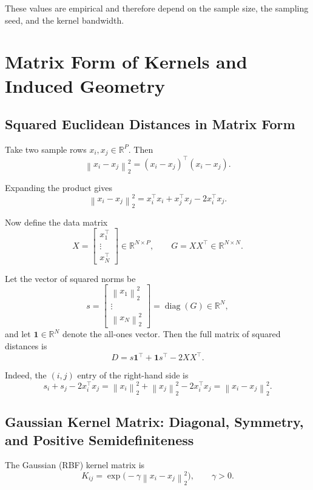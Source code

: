 \documentclass[11pt]{article}
\newcommand{\R}{\mathbb{R}}
\newcommand{\norm}[1]{\left\lVert #1 \right\rVert}
\newcommand{\transpose}{^{\top}}
\begin{document}
These values are empirical and therefore depend on the sample size, the sampling seed, and the kernel bandwidth.

\section{Matrix Form of Kernels and Induced Geometry}

\subsection{Squared Euclidean Distances in Matrix Form}

Take two sample rows $x_i, x_j \in \R^P$. Then
\[
\norm{x_i-x_j}_2^2
=
(x_i-x_j)\transpose (x_i-x_j).
\]

Expanding the product gives
\[
\norm{x_i-x_j}_2^2
=
x_i\transpose x_i
+
x_j\transpose x_j
- 2x_i\transpose x_j.
\]

Now define the data matrix
\[
X =
\begin{bmatrix}
x_1\transpose \\
\vdots \\
x_N\transpose
\end{bmatrix}
\in \R^{N \times P},
\qquad
G = XX\transpose \in \R^{N \times N}.
\]

Let the vector of squared norms be
\[
s =
\begin{bmatrix}
\norm{x_1}_2^2 \\
\vdots \\
\norm{x_N}_2^2
\end{bmatrix}
=
\operatorname{diag}(G)
\in \R^N,
\]
and let $\bm{1} \in \R^N$ denote the all-ones vector. Then the full matrix of squared distances is
\begin{equation}
D
=
s \bm{1}\transpose + \bm{1} s\transpose - 2XX\transpose.
\label{eq:distance-matrix}
\end{equation}

Indeed, the $(i,j)$ entry of the right-hand side is
\[
s_i + s_j - 2x_i\transpose x_j
=
\norm{x_i}_2^2 + \norm{x_j}_2^2 - 2x_i\transpose x_j
=
\norm{x_i-x_j}_2^2.
\]

\subsection{Gaussian Kernel Matrix: Diagonal, Symmetry, and Positive Semidefiniteness}

The Gaussian (RBF) kernel matrix is
\[
K_{ij} = \exp\bigl(-\gamma \norm{x_i-x_j}_2^2\bigr),
\qquad
\gamma > 0.
\]
\end{document}
